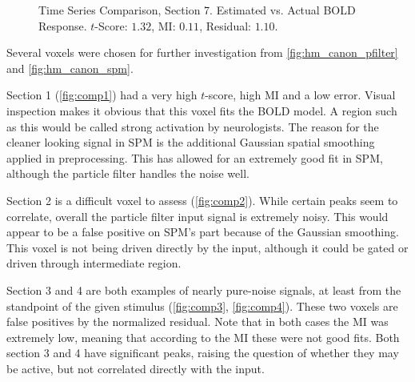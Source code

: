 \begin{figure}
\centering
{}
\caption[Time Series Comparison, Section 7]{Time Series Comparison, Section 7.
Estimated vs. Actual \ac{BOLD} Response. $t$-Score: $1.32$, \ac{MI}: $0.11$, Residual: $1.10$.}
\label{fig:comp7}
\end{figure}

Several voxels were chosen for further investigation from \autoref{fig:hm_canon_pfilter} and \autoref{fig:hm_canon_spm}.

Section 1 (\autoref{fig:comp1}) had a very high $t$-score, high \ac{MI} and
a low error. Visual inspection makes it obvious that this voxel fits the \ac{BOLD} model. A region
such as this would be called strong activation by neurologists. The
reason for the cleaner looking signal in \ac{SPM} is the additional Gaussian spatial smoothing
applied in preprocessing. This
has allowed for an extremely good fit in \ac{SPM}, although the particle filter handles the noise
well.

Section 2 is a difficult voxel to assess (\autoref{fig:comp2}).
While certain peaks seem to correlate, overall
the particle filter input signal is extremely noisy.
This would appear to be a false positive on \ac{SPM}'s part because of the Gaussian smoothing.
This voxel is not being driven directly by the input, although it
could be gated or driven through intermediate region.

Section 3 and 4 are both examples of nearly pure-noise signals, at least from the standpoint
of the given stimulus (\autoref{fig:comp3}, \autoref{fig:comp4}).
These two voxels are false positives by the normalized residual.
Note that in both cases the \ac{MI} was extremely low, meaning that
according to the \ac{MI} these were not good fits. Both section 3 and 4 have
significant peaks, raising the question of whether they may be active,
but not correlated directly with the input.

